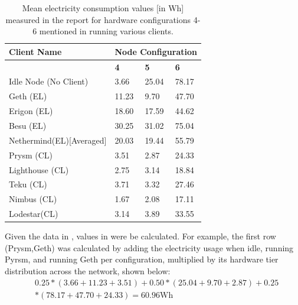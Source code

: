 \begin{table}[htb!]
\centering
\begin{tabular}{|l|lll|}
\hline
\textbf{Client Name} & \multicolumn{3}{l|}{\textbf{Node Configuration}}                               \\ \hline
\textbf{}            & \multicolumn{1}{l|}{\textbf{4}} & \multicolumn{1}{l|}{\textbf{5}} & \textbf{6} \\ \thickhline
Idle Node (No Client)               & \multicolumn{1}{l|}{3.66}       & \multicolumn{1}{l|}{25.04}      & 78.17      \\ \cline{1-1}
Geth (EL)            & \multicolumn{1}{l|}{11.23}      & \multicolumn{1}{l|}{9.70}       & 47.70      \\ \cline{1-1}
Erigon (EL)          & \multicolumn{1}{l|}{18.60}      & \multicolumn{1}{l|}{17.59}      & 44.62      \\ \cline{1-1}
Besu (EL)            & \multicolumn{1}{l|}{30.25}      & \multicolumn{1}{l|}{31.02}      & 75.04      \\ \cline{1-1}
Nethermind(EL)[Averaged] & \multicolumn{1}{l|}{20.03}       & \multicolumn{1}{l|}{19.44}       & 55.79      \\ \cline{1-1}
Prysm (CL)           & \multicolumn{1}{l|}{3.51}       & \multicolumn{1}{l|}{2.87}       & 24.33      \\ \cline{1-1}
Lighthouse (CL)      & \multicolumn{1}{l|}{2.75}       & \multicolumn{1}{l|}{3.14}       & 18.84      \\ \cline{1-1}
Teku (CL)            & \multicolumn{1}{l|}{3.71}       & \multicolumn{1}{l|}{3.32}       & 27.46      \\ \cline{1-1}
Nimbus (CL)          & \multicolumn{1}{l|}{1.67}       & \multicolumn{1}{l|}{2.08}       & 17.11      \\ \cline{1-1}
Lodestar(CL)         & \multicolumn{1}{l|}{3.14}       & \multicolumn{1}{l|}{3.89}       & 33.55      \\ \hline

\end{tabular}
\caption{Mean electricity consumption values [in Wh] measured in the report \cite{CryptoCarbonRatingsInstitute2022TheNetwork} for hardware configurations 4-6 mentioned in  running various clients.  }
\label{Table:ConsumptionValues}
\end{table}

Given the data in , values in  were be calculated. For example, the first row (Prysm,Geth) was calculated by adding the electricity usage when idle, running Pyrsm, and running Geth per configuration, multiplied by its hardware tier distribution across the network, shown below:
\begin{align}
    &\boldsymbol{0.25*(3.66 + 11.23 + 3.51) + 0.50 * (25.04 + 9.70 + 2.87) + 0.25} \nonumber\\
    &\boldsymbol{* (78.17 + 47.70 + 24.33) = 60.96}\text{Wh} \nonumber
\end{align}

